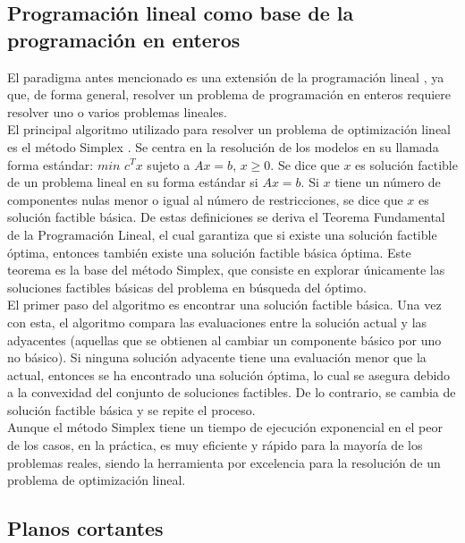 \documentclass[12pt]{report}
\begin{document}
\subsection{Programación lineal como base de la programación en enteros}

El paradigma antes mencionado es una extensión de la programación lineal \cite{Simplex}, ya que, de forma general, resolver un problema de programación en enteros requiere resolver uno o varios problemas lineales.\cite{Williams}\\

El principal algoritmo utilizado para resolver un problema de optimización lineal es el método Simplex \cite{Simplex}. Se centra en la resolución de los modelos en su llamada forma estándar: $min$ $c^Tx$ sujeto a $Ax=b$, $x\geq 0$.  Se dice que $x$ es solución factible de un problema lineal en su forma estándar si $Ax=b$. Si $x$ tiene un número de componentes nulas menor o igual al número de restricciones, se dice que $x$ es solución factible básica. De estas definiciones se deriva el Teorema Fundamental de la Programación Lineal, el cual garantiza que si existe una solución factible óptima, entonces también existe una solución factible básica óptima. Este teorema es la base del método Simplex, que consiste en explorar únicamente las soluciones factibles básicas del problema en búsqueda del óptimo.\\

El primer paso del algoritmo es encontrar una solución factible básica. Una vez con esta, el algoritmo compara las evaluaciones entre la solución actual y las adyacentes (aquellas que se obtienen al cambiar un componente básico por uno no básico). Si ninguna solución adyacente tiene una evaluación menor que la actual, entonces se ha encontrado una solución óptima, lo cual se asegura debido a la convexidad del conjunto de soluciones factibles. De lo contrario, se cambia de solución factible básica y se repite el proceso.\\

Aunque el método Simplex tiene un tiempo de ejecución exponencial en el peor de los casos, en la práctica, es muy eficiente y rápido para la mayoría de los problemas reales, siendo la herramienta por excelencia para la resolución de un problema de optimización lineal. 

\subsection{Planos cortantes}
\end{document}
